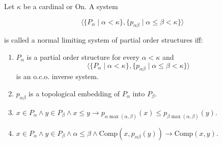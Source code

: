 Let $\kappa$ be a cardinal or $\mathrm{On}$. A system

$$\langle \{P_{\alpha} \mid \alpha < \kappa\}, \{p_{\alpha\beta} \mid \alpha \leq \beta < \kappa\} \rangle$$

is called a normal limiting system of partial order structures iff:

\begin{enumerate}
\item $P_{\alpha}$ is a partial order structure for every $\alpha < \kappa$ and
$$\langle \{P_{\alpha} \mid \alpha < \kappa\}, \{p_{\alpha\beta} \mid \alpha \leq \beta < \kappa\} \rangle$$
is an o.c.o. inverse system.
\item $p_{\alpha\beta}$ is a topological embedding of $P_{\alpha}$ into $P_{\beta}$.
\item $x \in P_{\alpha} \land y \in P_{\beta} \land x \leq y \rightarrow p_{\alpha\max(\alpha,\beta)}(x) \leq p_{\beta\max(\alpha,\beta)}(y)$.
\item $x \in P_{\alpha} \land y \in P_{\beta} \land \alpha \leq \beta \land \mathrm{Comp}(x, p_{\alpha\beta}(y)) \rightarrow \mathrm{Comp}(x, y)$.
\end{enumerate}
